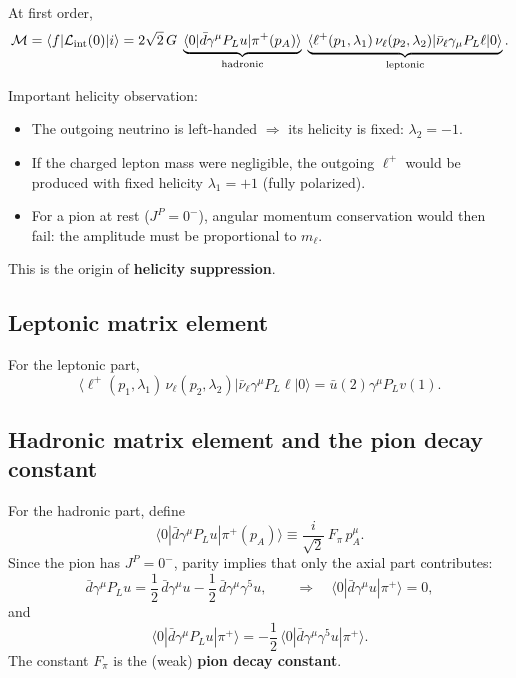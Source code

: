 At first order,
\begin{equation}
\mathcal{M}
=
\langle f|\mathcal{L}_{\rm int}(0)|i\rangle
=
2\sqrt{2}\,G\;
\underbrace{\langle 0|\bar d\gamma^\mu P_L u|\pi^+(p_A)\rangle}_{\text{hadronic}}
\;
\underbrace{\langle \ell^+(p_1,\lambda_1)\,\nu_\ell(p_2,\lambda_2)|\bar\nu_\ell\gamma_\mu P_L \ell|0\rangle}_{\text{leptonic}}.
\end{equation}

Important helicity observation:
\begin{itemize}
  \item The outgoing neutrino is left-handed $\Rightarrow$ its helicity is fixed: $\lambda_2=-1$.
  \item If the charged lepton mass were negligible, the outgoing $\ell^+$ would be produced
        with fixed helicity $\lambda_1=+1$ (fully polarized).
  \item For a pion at rest ($J^P=0^-$), angular momentum conservation would then fail:
        the amplitude must be proportional to $m_\ell$.
\end{itemize}
This is the origin of \textbf{helicity suppression}.

\subsection{Leptonic matrix element}
For the leptonic part,
\begin{equation}
\langle \ell^+(p_1,\lambda_1)\,\nu_\ell(p_2,\lambda_2)|\bar\nu_\ell\gamma^\mu P_L \ell|0\rangle
=
\bar u(2)\gamma^\mu P_L v(1).
\end{equation}

\subsection{Hadronic matrix element and the pion decay constant}
For the hadronic part, define
\begin{equation}
\langle 0|\bar d\gamma^\mu P_L u|\pi^+(p_A)\rangle
\equiv
\frac{i}{\sqrt{2}}\,F_\pi\,p_A^\mu.
\end{equation}
Since the pion has $J^P=0^-$, parity implies that only the axial part contributes:
\begin{equation}
\bar d\gamma^\mu P_L u
=
\frac12\,\bar d\gamma^\mu u
-\frac12\,\bar d\gamma^\mu\gamma^5 u,
\qquad
\Rightarrow\quad
\langle 0|\bar d\gamma^\mu u|\pi^+\rangle=0,
\end{equation}
and
\begin{equation}
\langle 0|\bar d\gamma^\mu P_L u|\pi^+\rangle
=
-\frac12\,\langle 0|\bar d\gamma^\mu\gamma^5 u|\pi^+\rangle.
\end{equation}
The constant $F_\pi$ is the (weak) \textbf{pion decay constant}.


